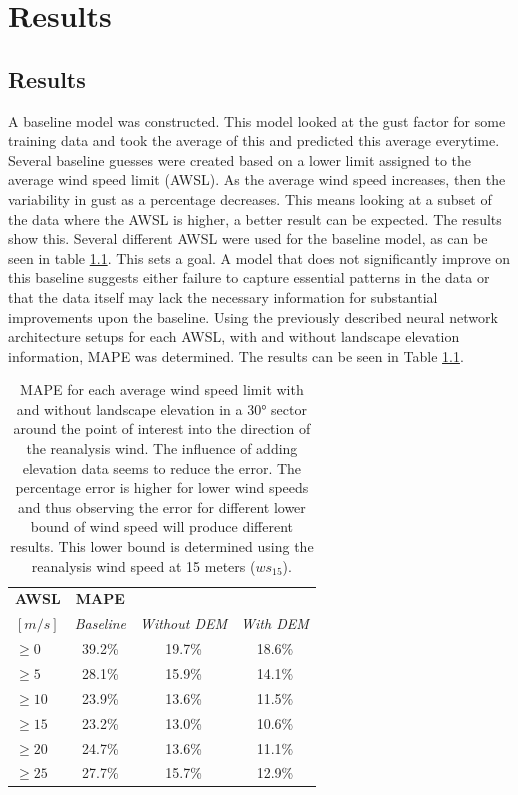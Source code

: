 \chapter{Results}
\label{Chapter5}
\section{Results}
A baseline model was constructed. This model looked at the gust factor for some training data and took the average of this and predicted this average everytime. Several baseline guesses were created based on a lower limit assigned to the average wind speed limit (AWSL). As the average wind speed increases, then the variability in gust as a percentage decreases\cite{mean_gust_HA_HO}. This means looking at a subset of the data where the AWSL is higher, a better result can be expected. The results show this. Several different AWSL were used for the baseline model, as can be seen in table \ref{table:results}. This sets a goal. A model that does not significantly improve on this baseline suggests either failure to capture essential patterns in the data or that the data itself may lack the necessary information for substantial improvements upon the baseline. Using the previously described neural network architecture setups for each AWSL, with and without landscape elevation information, MAPE was determined. The results can be seen in Table \ref{table:results}.

\begin{table}[h]
    \caption[Model results for different AWSL]{MAPE for each average wind speed limit with and without landscape elevation in a 30° sector around the point of interest into the direction of the reanalysis wind. The influence of adding elevation data seems to reduce the error. The percentage error is higher for lower wind speeds and thus observing the error for different lower bound of wind speed will produce different results. This lower bound is determined using the reanalysis wind speed at 15 meters ($ws_{15}$).}
    \label{table:results}
    \centering
    \begin{tabular}{lccc}
        \toprule
        \textbf{AWSL} & \textbf{MAPE} & &\\ 
        $[m/s]$ & \textit{Baseline} &  \textit{Without DEM} & \textit{With DEM} \\\hline
        $\geq 0$ & 39.2\% & 19.7\% & 18.6\% \\
        $\geq 5$ & 28.1\% & 15.9\% & 14.1\%\\
        $\geq 10$ & 23.9\% & 13.6\% & 11.5\%\\
        $\geq 15$ & 23.2\% & 13.0\% & 10.6\%\\
        $\geq 20$ & 24.7\% & 13.6\% & 11.1\%\\
        $\geq 25$ & 27.7\% & 15.7\% & 12.9\%\\
        \bottomrule
    \end{tabular}
\end{table}

